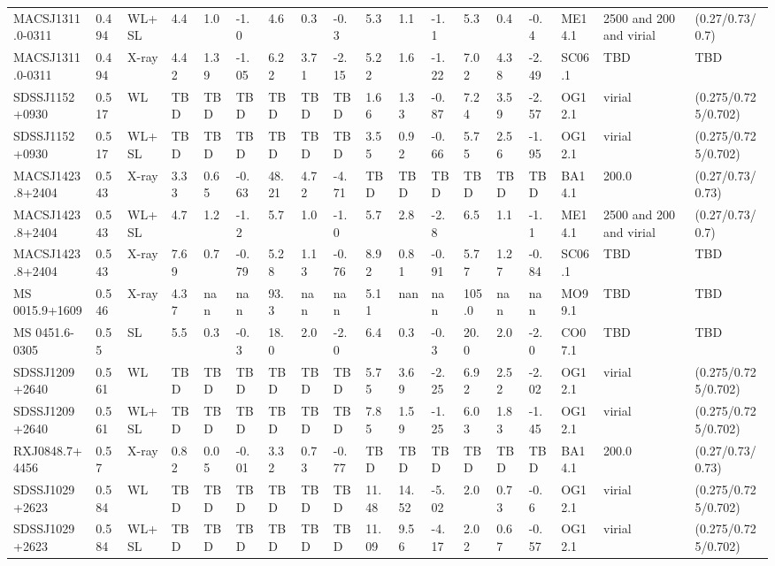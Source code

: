 \documentclass{article}
\begin{document}
\begin{center}
\begin{landscape}
\begin{longtable}{llllllllllllllllll}
MACSJ1311.0-0311 & 0.494 & WL+SL & 4.4 & 1.0 & -1.0 & 4.6 & 0.3 & -0.3 & 5.3 & 1.1 & -1.1 & 5.3 & 0.4 & -0.4 & ME14.1 & 2500 and 200 and virial & (0.27/0.73/0.7) \\
MACSJ1311.0-0311 & 0.494 & X-ray & 4.42 & 1.39 & -1.05 & 6.22 & 3.71 & -2.15 & 5.22 & 1.6 & -1.22 & 7.02 & 4.38 & -2.49 & SC06.1 & TBD & TBD \\
SDSSJ1152+0930 & 0.517 & WL & TBD & TBD & TBD & TBD & TBD & TBD & 1.66 & 1.33 & -0.87 & 7.24 & 3.59 & -2.57 & OG12.1 & virial & (0.275/0.725/0.702) \\
SDSSJ1152+0930 & 0.517 & WL+SL & TBD & TBD & TBD & TBD & TBD & TBD & 3.55 & 0.92 & -0.66 & 5.75 & 2.56 & -1.95 & OG12.1 & virial & (0.275/0.725/0.702) \\
MACSJ1423.8+2404 & 0.543 & X-ray & 3.33 & 0.65 & -0.63 & 48.21 & 4.72 & -4.71 & TBD & TBD & TBD & TBD & TBD & TBD & BA14.1 & 200.0 & (0.27/0.73/0.73) \\
MACSJ1423.8+2404 & 0.543 & WL+SL & 4.7 & 1.2 & -1.2 & 5.7 & 1.0 & -1.0 & 5.7 & 2.8 & -2.8 & 6.5 & 1.1 & -1.1 & ME14.1 & 2500 and 200 and virial & (0.27/0.73/0.7) \\
MACSJ1423.8+2404 & 0.543 & X-ray & 7.69 & 0.7 & -0.79 & 5.28 & 1.13 & -0.76 & 8.92 & 0.81 & -0.91 & 5.77 & 1.27 & -0.84 & SC06.1 & TBD & TBD \\
MS 0015.9+1609 & 0.546 & X-ray & 4.37 & nan & nan & 93.3 & nan & nan & 5.11 & nan & nan & 105.0 & nan & nan & MO99.1 & TBD & TBD \\
MS 0451.6-0305 & 0.55 & SL & 5.5 & 0.3 & -0.3 & 18.0 & 2.0 & -2.0 & 6.4 & 0.3 & -0.3 & 20.0 & 2.0 & -2.0 & CO07.1 & TBD & TBD \\
SDSSJ1209+2640 & 0.561 & WL & TBD & TBD & TBD & TBD & TBD & TBD & 5.75 & 3.69 & -2.25 & 6.92 & 2.52 & -2.02 & OG12.1 & virial & (0.275/0.725/0.702) \\
SDSSJ1209+2640 & 0.561 & WL+SL & TBD & TBD & TBD & TBD & TBD & TBD & 7.85 & 1.59 & -1.25 & 6.03 & 1.83 & -1.45 & OG12.1 & virial & (0.275/0.725/0.702) \\
RXJ0848.7+4456 & 0.57 & X-ray & 0.82 & 0.05 & -0.01 & 3.32 & 0.73 & -0.77 & TBD & TBD & TBD & TBD & TBD & TBD & BA14.1 & 200.0 & (0.27/0.73/0.73) \\
SDSSJ1029+2623 & 0.584 & WL & TBD & TBD & TBD & TBD & TBD & TBD & 11.48 & 14.52 & -5.02 & 2.0 & 0.73 & -0.6 & OG12.1 & virial & (0.275/0.725/0.702) \\
SDSSJ1029+2623 & 0.584 & WL+SL & TBD & TBD & TBD & TBD & TBD & TBD & 11.09 & 9.56 & -4.17 & 2.02 & 0.67 & -0.57 & OG12.1 & virial & (0.275/0.725/0.702) \\

\end{longtable}
\end{landscape}
\end{center}
\end{document}
